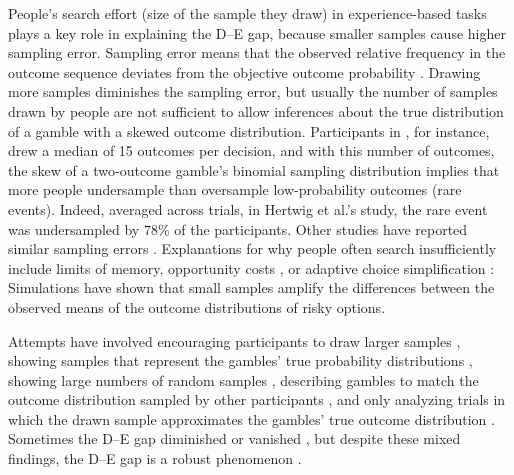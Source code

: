\documentclass[a4paper, man, natbib, floatsintext]{apa6}
\begin{document}
People's search effort (size of the sample they draw) in experience-based tasks plays a key role in explaining the D--E gap, because smaller samples cause higher sampling error. Sampling error means that the observed relative frequency in the outcome sequence deviates from the objective outcome probability \citep{Hadar2009}. Drawing more samples diminishes the sampling error, but usually the number of samples drawn by people are not sufficient to allow inferences about the true distribution of a gamble with a skewed outcome distribution. Participants in \cite{Hertwig2004}, for instance, drew a median of 15 outcomes per decision, and with this number of outcomes, the skew of a two-outcome gamble's binomial sampling distribution implies that more people undersample than oversample low-probability outcomes (rare events). Indeed, averaged across trials, in Hertwig et al.'s study, the rare event was undersampled by $78\%$ of the participants. Other studies have reported similar sampling errors \citep[e.g.,][]{Hau2008,Rakow2008}. Explanations for why people often search insufficiently include limits of memory, opportunity costs \citep{Hau2008}, or adaptive choice simplification \citep{Hertwig2010}: Simulations have shown that small samples amplify the differences between the observed means of the outcome distributions of risky options.

 Attempts have involved encouraging participants to draw larger samples \citep{Hau2008}, showing samples that represent the gambles' true probability distributions \citep{Ungemach2009}, showing large numbers of random samples \citep{Hau2008,Hau2010}, describing gambles to match the outcome distribution sampled by other participants \citep{Rakow2008}, and only analyzing trials in which the drawn sample approximates the gambles' true outcome distribution \citep[e.g.,][]{Camilleri2009, Camilleri2011a}. Sometimes the D--E gap diminished \citep{Hau2008,Hau2010, Ungemach2009} or vanished \citep{Gloeckner2012, Camilleri2009,Camilleri2011a,Rakow2008}, but despite these mixed findings, the D--E gap is a robust phenomenon \citep[for a recent meta-analysis, see][]{Wulff2017}. 

\end{document}
